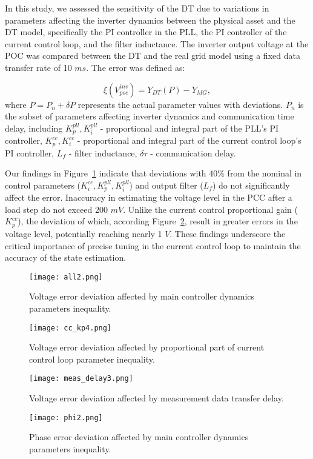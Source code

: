 In this study, we assessed the sensitivity of the DT due to variations in parameters affecting the inverter dynamics between the physical asset and the DT model, specifically the PI controller in the PLL, the PI controller of the current control loop, and the filter inductance. The inverter output voltage at the POC was compared between the DT and the real grid model using a fixed data transfer rate of 10 $ms$. The error was defined as:

\begin{equation}
     \xi(V_{poc}^{inv}) = Y_{DT}(P) - Y_{MG},
\end{equation}
where $P = P_n + \delta P$ represents the actual parameter values with deviations. $P_n$ is the subset of parameters affecting inverter dynamics and communication time delay, including $K_p^{pll}, K_i^{pll}$ - proportional and integral part of the PLL's PI controller, $K_p^{cc}, K_i^{cc}$ - proportional and integral part of the current control loop's PI controller, $L_f$ - filter inductance, $\delta\tau$ - communication delay. 

Our findings in Figure~\cref{fig:s_all} indicate that deviations with 40\% from the nominal in control parameters ($K_i^{cc}, K_p^{pll}, K_i^{pll}$) and output filter ($L_f$) do not significantly affect the error. Inaccuracy in estimating the voltage level in the PCC after a load step do not exceed 200 $mV$. Unlike the current control proportional gain ($K_p^{cc}$), the deviation of which, according Figure~\cref{fig:s_cc},  result in greater errors in the voltage level, potentially reaching nearly 1 $V$. These findings underscore the critical importance of precise tuning in the current control loop to maintain the accuracy of the state estimation.

\begin{figure}[htbp]
    \centering
    \texttt{[image: all2.png]}
    \caption{Voltage error deviation affected by main controller dynamics parameters inequality.}
    \label{fig:s_all}
\end{figure}
\begin{figure}[htbp]
    \centering
    \texttt{[image: cc\_kp4.png]}
    \caption{Voltage error deviation affected by proportional part of current control loop parameter inequality.}
    \label{fig:s_cc}
\end{figure}
\begin{figure}[htbp]
    \centering
    \texttt{[image: meas\_delay3.png]}
    \caption{Voltage error deviation affected by measurement data transfer delay.}
    \label{fig:s_md}
\end{figure}
\begin{figure}[htbp]
    \centering
    \texttt{[image: phi2.png]}
    \caption{Phase error deviation affected by main controller dynamics parameters inequality.}
    \label{fig:phi}
\end{figure}

